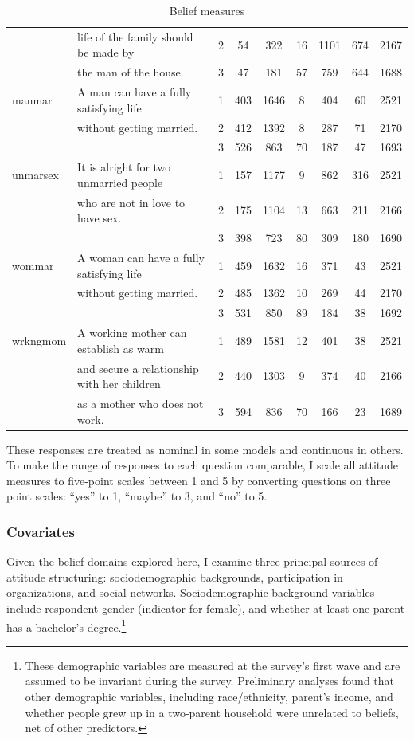 \documentclass[12pt,]{article}
\begin{document}
\begin{table}
\begin{center}
\begin{tabular}{l l c c c c c c c}
 & life of the family should be made by  & 2 & 54 & 322 & 16 & 1101 & 674 & 2167\\
 & the man of the house. & 3 & 47 & 181 & 57 & 759 & 644 & 1688\\
 manmar & A man can have a fully satisfying life   & 1 & 403 & 1646 & 8 & 404 & 60 & 2521\\
 & without getting married. & 2 & 412 & 1392 & 8 & 287 & 71 & 2170\\
 &  & 3 & 526 & 863 & 70 & 187 & 47 & 1693\\
 unmarsex  & It is alright for two unmarried people    & 1 & 157 & 1177 & 9 & 862 & 316 & 2521\\
 & who are not in love to have sex. & 2 & 175 & 1104 & 13 & 663 & 211 & 2166\\
 & & 3 & 398 & 723 & 80 & 309 & 180 & 1690\\
 wommar & A woman can have a fully satisfying life   & 1 & 459 & 1632 & 16 & 371 & 43 & 2521\\
 & without getting married. & 2 & 485 & 1362 & 10 & 269 & 44 & 2170\\
 &  & 3 & 531 & 850 & 89 & 184 & 38 & 1692\\
 wrkngmom & A working mother can establish as warm    & 1 & 489 & 1581 & 12 & 401 & 38 & 2521\\
 & and secure a relationship with her children    & 2 & 440 & 1303 & 9 & 374 & 40 & 2166\\
 & as a mother who does not work. & 3 & 594 & 836 & 70 & 166 & 23 & 1689\\
\hline
\end{tabular}
\caption{Belief measures}
\label{table:beliefs}
\end{center}
\end{table}

These responses are treated as nominal in some models and continuous in others. To make the range of responses to each question comparable, I scale all attitude measures to five-point scales between 1 and 5 by converting questions on three point scales: ``yes'' to 1, ``maybe'' to 3, and ``no'' to 5.

\hypertarget{covariates}{%
\subsubsection{Covariates}\label{covariates}}

Given the belief domains explored here, I examine three principal sources of attitude structuring: sociodemographic backgrounds, participation in organizations, and social networks. Sociodemographic background variables include respondent gender (indicator for female), and whether at least one parent has a bachelor's degree.\footnote{These demographic variables are measured at the survey's first wave and are assumed to be invariant during the survey. Preliminary analyses found that other demographic variables, including race/ethnicity, parent's income, and whether people grew up in a two-parent household were unrelated to beliefs, net of other predictors.}
\end{document}
